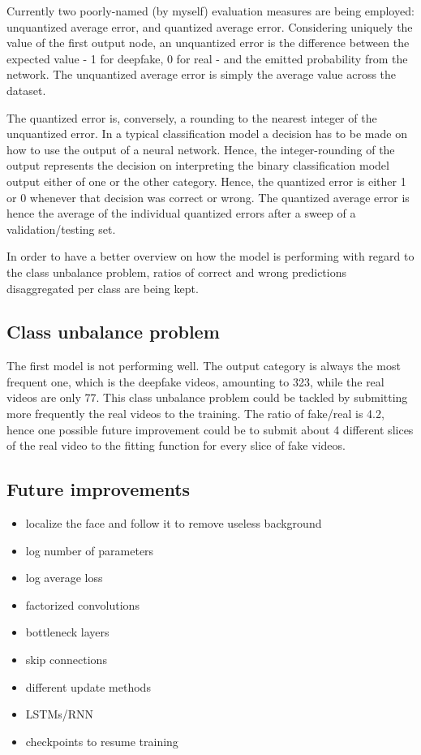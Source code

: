 Currently two poorly-named (by myself) evaluation measures are being employed: unquantized average error,
and quantized average error.
Considering uniquely the value of the first output node, an unquantized error is the
difference between the expected value - 1 for deepfake, 0 for real - and the
emitted probability from the network. The unquantized average error
is simply the average value across the dataset.

The quantized error is, conversely, a rounding to the nearest integer of the unquantized error.
In a typical classification model a decision has to be made on how to use the output
of a neural network. Hence, the integer-rounding of the output represents the
decision on interpreting the binary classification model output either of one or the other category.
Hence, the quantized error is either 1 or 0 whenever that decision was correct or wrong.
The quantized average error is hence the average of the individual quantized errors
after a sweep of a validation/testing set.

In order to have a better overview on how the model is performing with regard to
the class unbalance problem, ratios of correct and wrong predictions disaggregated 
per class are being kept.

\subsection{Class unbalance problem}

The first model is not performing well. The output category is always the most frequent 
one, which is the deepfake videos, amounting to 323, while the real videos are only 77.
This class unbalance problem could be tackled by submitting more frequently
the real videos to the training. The ratio of fake/real is 4.2, hence one possible
future improvement could be to submit about 4 different slices of the real video to 
the fitting function for every slice of fake videos.

\subsection{Future improvements}
\begin{itemize}
\item localize the face and follow it to remove useless background
\item log number of parameters
\item log average loss
\item factorized convolutions
\item bottleneck layers
\item skip connections
\item different update methods
\item LSTMs/RNN
\item checkpoints to resume training
\end{itemize}
